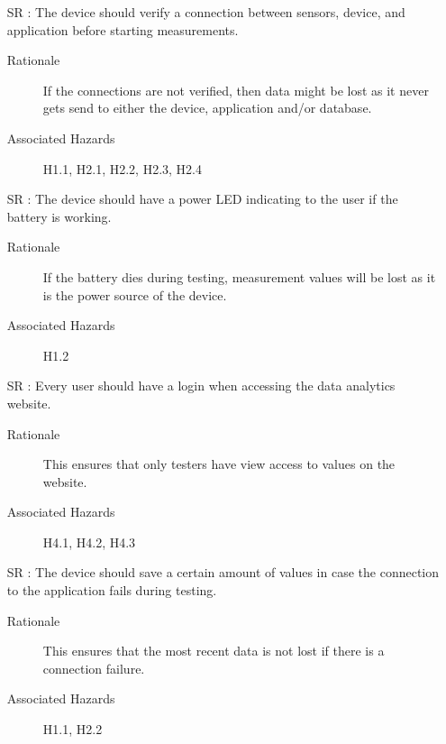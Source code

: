 \documentclass[12pt]{article}
\newcounter{reqnum} %
\begin{document}
\begin{itemize}
  \item[SR \refstepcounter{reqnum}\thereqnum:] The device should verify a connection between sensors, device, and application before starting measurements.
    \begin{description} \item[Rationale] If the connections are not verified, then data might be lost as it never gets send to either the device, application and/or database.  \end{description}
    \begin{description} \item[Associated Hazards] H1.1, H2.1, H2.2, H2.3, H2.4  \end{description}
  
  \item[SR \refstepcounter{reqnum}\thereqnum:] The device should have a power LED indicating to the user if the battery is working.
    \begin{description} \item[Rationale] If the battery dies during testing, measurement values will be lost as it is the power source of the device.  \end{description}
    \begin{description} \item[Associated Hazards] H1.2  \end{description}

  \item[SR \refstepcounter{reqnum}\thereqnum:] Every user should have a login when accessing the data analytics website.
    \begin{description} \item[Rationale] This ensures that only testers have view access to values on the website.   \end{description}
    \begin{description} \item[Associated Hazards] H4.1, H4.2, H4.3 \end{description}
  
  \item[SR \refstepcounter{reqnum}\thereqnum:] The device should save a certain amount of values in case the connection to the application fails during testing.
    \begin{description} \item[Rationale] This ensures that the most recent data is not lost if there is a connection failure.   \end{description}
    \begin{description} \item[Associated Hazards] H1.1, H2.2  \end{description}
  

\end{itemize}
\end{document}
